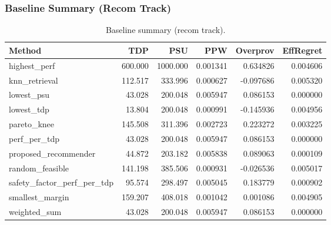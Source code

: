 \subsubsection{Baseline Summary (Recom Track)}
\begin{table}[t]
\centering
\small
\caption{Baseline summary (recom track).}
\label{tab:baseline_recom}
\begin{tabular}{lrrrrr}
\hline
Method & TDP & PSU & PPW & Overprov & EffRegret \\
\hline
highest\_perf & 600.000 & 1000.000 & 0.001341 & 0.634826 & 0.004606 \\
knn\_retrieval & 112.517 & 333.996 & 0.000627 & -0.097686 & 0.005320 \\
lowest\_psu & 43.028 & 200.048 & 0.005947 & 0.086153 & 0.000000 \\
lowest\_tdp & 13.804 & 200.048 & 0.000991 & -0.145936 & 0.004956 \\
pareto\_knee & 145.508 & 311.396 & 0.002723 & 0.223272 & 0.003225 \\
perf\_per\_tdp & 43.028 & 200.048 & 0.005947 & 0.086153 & 0.000000 \\
proposed\_recommender & 44.872 & 203.182 & 0.005838 & 0.089063 & 0.000109 \\
random\_feasible & 141.198 & 385.506 & 0.000931 & -0.026536 & 0.005017 \\
safety\_factor\_perf\_per\_tdp & 95.574 & 298.497 & 0.005045 & 0.183779 & 0.000902 \\
smallest\_margin & 159.207 & 408.018 & 0.001042 & 0.001086 & 0.004905 \\
weighted\_sum & 43.028 & 200.048 & 0.005947 & 0.086153 & 0.000000 \\
\hline
\end{tabular}
\end{table}

